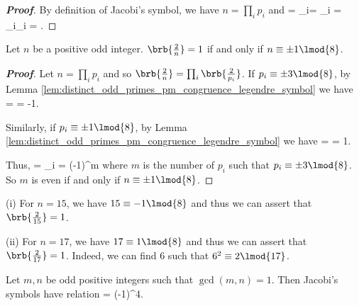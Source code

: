 \begin{proof}[\bf Proof]
By definition of Jacobi's symbol, we have $n = \prod_i p_i$ and
\be
{} = \prod_i= \prod_i = \prod_i\prod_i = .
\ee
\end{proof}

\begin{proposition}
Let $n$ be a positive odd integer. $\brb{\frac 2n}=1$ if and only if $n\equiv \pm 1\lmod{8}$.
\end{proposition}

\begin{proof}[\bf Proof]
Let $n = \prod_i p_i$ and so $\brb{\frac 2n} = \prod_i \brb{\frac 2{p_i}}$. If $p_i\equiv \pm 3\lmod{8}$, by Lemma \ref{lem:distinct_odd_primes_pm_congruence_legendre_symbol} we have
\be
{} =  = -1.
\ee

Similarly, if $p_i\equiv \pm 1\lmod{8}$, by Lemma \ref{lem:distinct_odd_primes_pm_congruence_legendre_symbol} we have
\be
{} =  = 1.
\ee

Thus,
\be
{} = \prod_i  = (-1)^m
\ee
where $m$ is the number of $p_i$ such that $p_i \equiv \pm 3\lmod{8}$. So $m$ is even if and only if $n\equiv \pm 1\lmod{8}$.
\end{proof}

\begin{example}
\ben
\item [(i)] For $n = 15$, we have $15\equiv - 1\lmod{8}$ and thus we can assert that $\brb{\frac 2{15}} = 1$. %

\item [(ii)] For $n= 17$, we have $17\equiv 1\lmod{8}$ and thus we can assert that $\brb{\frac 2{17}} = 1$. Indeed, we can find 6 such that $6^2 \equiv 2 \lmod{17}$.
\een
\end{example}


\begin{theorem}\label{thm:law_of_quadratic_reciprocity_jacobi_symbol}
Let $m,n$ be odd positive integers such that $\gcd(m,n) = 1$. Then Jacobi's symbols have relation
\be
{} = (-1)^{4}.
\ee
\end{theorem}

